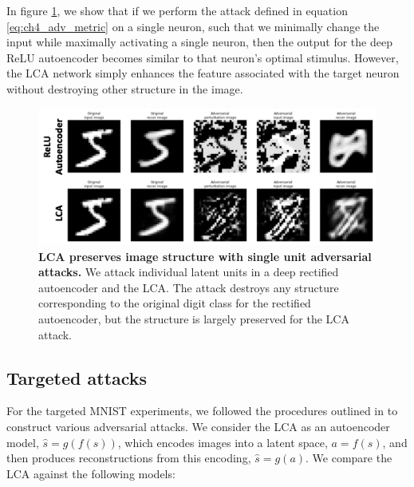 In figure \ref{fig:ch4_marzi_unit_relu_lca}, we show that if we perform the attack defined in equation \eqref{eq:ch4_adv_metric} on a single neuron, such that we minimally change the input while maximally activating a single neuron, then the output for the deep ReLU autoencoder becomes similar to that neuron's optimal stimulus. However, the LCA network simply enhances the feature associated with the target neuron without destroying other structure in the image.

\begin{figure}[h]
    \centering
    \includegraphics[width=\textwidth]{figures/adv_marzi_unit_relu_lca.png}
    \caption{\textbf{LCA preserves image structure with single unit adversarial attacks.} We attack individual latent units in a deep rectified autoencoder and the LCA. The attack destroys any structure corresponding to the original digit class for the rectified autoencoder, but the structure is largely preserved for the LCA attack.}
    \label{fig:ch4_marzi_unit_relu_lca}
\end{figure}


\subsection{Targeted attacks}\label{sec:ch4_mnist_experiments}
For the targeted MNIST experiments, we followed the procedures outlined in \parencite{kos2018adversarial, kurakin2016adversarial, carlini2017towards} to construct various adversarial attacks. We consider the LCA as an autoencoder model, $\hat{s}=g(f(s))$, which encodes images into a latent space, $a=f(s)$, and then produces reconstructions from this encoding, $\hat{s}=g(a)$. We compare the LCA against the following models:


